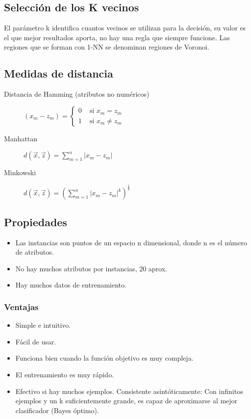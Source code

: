 \documentclass[12pt, twoside, openright]{report} %
\begin{document}
\subsection{Selección de los K vecinos}
El parámetro k identifica cuantos vecinos se utilizan para la decisión, su valor es el que mejor resultados aporta, no hay una regla que siempre funcione. Las regiones que se forman con 1-NN se denominan regiones de Voronoi.

\subsection{Medidas de distancia}
\begin{description}
	\item[Distancia de Hamming (atributos no numéricos)] $\left(x_{m}-z_{m}\right)=\left\{\begin{array}{ll}0 & \text { si } x_{m}=z_{m} \\ 1 & \text { si } x_{m} \neq z_{m}\end{array}\right.$
	\item[Manhattan] $d(\vec{x}, \vec{z})=\sum_{m=1}^{n}\left|x_{m}-z_{m}\right|$
	\item[Minkowski] $d(\vec{x}, \vec{z})=\left(\sum_{m=1}^{n}\left|x_{m}-z_{m}\right|^{k}\right)^{\frac{1}{k}}$
\end{description}
\pagebreak
\subsection{Propiedades}
\begin{itemize}
	\item Las instancias son puntos de un espacio n dimensional, donde n es el número de atributos.
	\item No hay muchos atributos por instancias, 20 aprox.
	\item Hay muchos datos de entrenamiento.

\end{itemize}

\subsubsection{Ventajas}
\begin{itemize}
	\item Simple e intuitivo.
	\item Fácil de usar.
	\item Funciona bien cuando la función objetivo es muy compleja.
	\item El entrenamiento es muy rápido.
	\item Efectivo si hay muchos ejemplos. Consistente asintóticamente: Con infinitos ejemplos y un k suficientemente grande, es capaz de aproximarse al mejor clasificador (Bayes óptimo).

\end{itemize}
\end{document}
